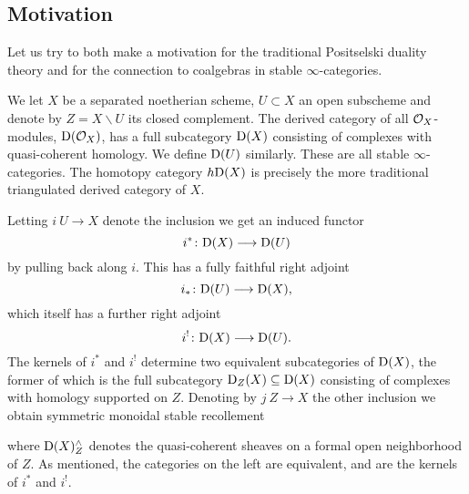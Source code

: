 \subsection*{Motivation}

Let us try to both make a motivation for the traditional Positselski duality theory and for the connection to coalgebras in stable $\infty$-categories. 

We let $X$ be a separated noetherian scheme, $U\subset X$ an open subscheme and denote by $Z = X\backslash U$ its closed complement. The derived category of all $\mathcal{O}_X$-modules, $\mathrm{D}(\mathcal{O}_X)$, has a full subcategory $\mathrm{D}(X)$ consisting of complexes with quasi-coherent homology. We define $\mathrm{D}(U)$ similarly. These are all stable $\infty$-categories. The homotopy category $h\mathrm{D}(X)$ is precisely the more traditional triangulated derived category of $X$. 

Letting $i\:U\to X$ denote the inclusion we get an induced functor 
\[i^*\colon \mathrm{D}(X)\longrightarrow \mathrm{D}(U)\]
by pulling back along $i$. This has a fully faithful right adjoint 
\[i_*\colon \mathrm{D}(U)\longrightarrow \mathrm{D}(X),\] which itself has a further right adjoint 
\[i^!\colon \mathrm{D}(X)\longrightarrow \mathrm{D}(U).\] The kernels of $i^*$ and $i^!$ determine two equivalent subcategories of $\mathrm{D}(X)$, the former of which is the full subcategory $\mathrm{D}_Z(X)\subseteq \mathrm{D}(X)$ consisting of complexes with homology supported on $Z$. Denoting by $j\: Z\to X$ the other inclusion we obtain symmetric monoidal stable recollement
\begin{center}
\end{center}
where $\mathrm{D}(X)^\wedge_Z$ denotes the quasi-coherent sheaves on a formal open neighborhood of $Z$. As mentioned, the categories on the left are equivalent, and are the kernels of $i^*$ and $i^!$. 

